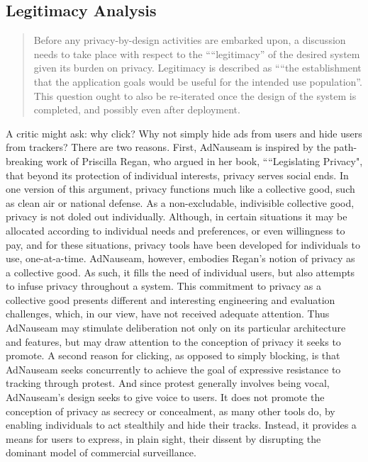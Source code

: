\documentclass[conference]{IEEEtran}
\begin{document}
\subsection{Legitimacy Analysis}

\blockquote{Before any privacy-by-design activities are embarked upon, a discussion needs to take place with respect to the ““legitimacy” of the desired system given its burden on privacy. Legitimacy is described as ““the establishment that the application goals would be useful for the intended use population”. This question ought to also be re-iterated once the design of the system is completed, and possibly even after deployment.\cite{Iachello}}

A critic might ask: why click? Why not simply hide ads from users and hide users from trackers? There are two reasons. First, AdNauseam is inspired by the path-breaking work of Priscilla Regan, who argued in her book, ““Legislating Privacy", that beyond its protection of individual interests, privacy serves social ends\cite{Regan}. In one version of this argument, privacy functions much like a collective good, such as clean air or national defense. As a non-excludable, indivisible collective good, privacy is not doled out individually. Although, in certain situations it may be allocated according to individual needs and preferences, or even willingness to pay, and for these situations, privacy tools have been developed for individuals to use, one-at-a-time. AdNauseam, however, embodies Regan's notion of privacy as a collective good. As such, it fills the need of individual users, but also attempts to infuse privacy throughout a system. This commitment to privacy as a collective good presents different and interesting engineering and evaluation challenges, which, in our view, have not received adequate attention. Thus AdNauseam may stimulate deliberation not only on its particular architecture and features, but may draw attention to the conception of privacy it seeks to promote. A second reason for clicking, as opposed to simply blocking, is that AdNauseam seeks concurrently to achieve the goal of expressive resistance to tracking through protest. And since protest generally involves being vocal, AdNauseam's design seeks to give voice to users. It does not promote the conception of privacy as secrecy or concealment, as many other tools do, by enabling individuals to act stealthily and hide their tracks. Instead, it provides a means for users to express, in plain sight, their dissent by disrupting the dominant model of commercial surveillance.
\end{document}
